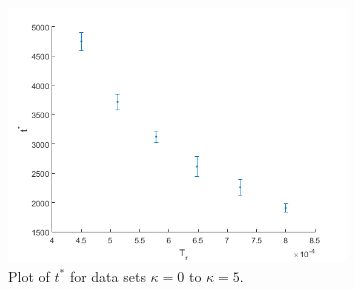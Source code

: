 \begin{figure}[h]
	\centering
	\includegraphics[width=0.8\textwidth]{fig_res/res_tinc_newnoise}
	\caption{Plot of $t^*$ for data sets $\kappa=0$ to $\kappa=5$.}\label{fig:res_tinc_newnoise}
\end{figure}













